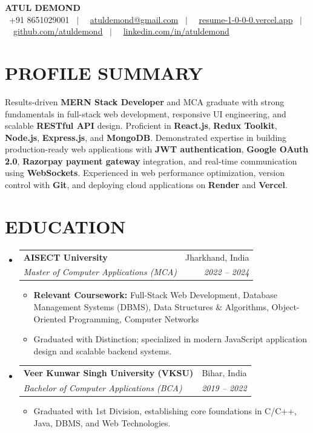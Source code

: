 \documentclass[letterpaper,10pt]{article}
\makeatletter
\newcommand{\resumeItem}[1]{
  \item\small{
    {#1 \vspace{-1.5pt}}
  }
}
\newcommand{\resumeSubheading}[4]{
  \vspace{-1.5pt}\item
    \begin{tabular*}{0.97\textwidth}[t]{l@{\extracolsep{\fill}}r}
      \textbf{#1} & #2 \\
      \textit{\small#3} & \textit{\small #4} \\
    \end{tabular*}\vspace{-6pt}
}
\newcommand{\resumeSubHeadingListStart}{\begin{itemize}[leftmargin=0.15in, label={}]}
\newcommand{\resumeSubHeadingListEnd}{\end{itemize}}
\newcommand{\resumeItemListStart}{\begin{itemize}[leftmargin=0.15in]}
\newcommand{\resumeItemListEnd}{\end{itemize}\vspace{-4pt}}
\makeatother
\begin{document}
\begin{center}
    {\Huge \textbf{ATUL DEMOND}} \\ \vspace{4pt}
    \small
    \faPhone* \ +91 8651029001 \ $|$ \
    \faEnvelope \ \href{mailto:atuldemond@gmail.com}{atuldemond@gmail.com} \ $|$ \
    \faGlobe \ \href{https://resume-1-0-0-0.vercel.app}{resume-1-0-0-0.vercel.app} \ $|$ \
    \faGithub \ \href{https://github.com/atuldemond}{github.com/atuldemond} \ $|$ \
    \faLinkedin \ \href{https://linkedin.com/in/atuldemond}{linkedin.com/in/atuldemond}
\end{center}
\vspace{-6pt}

\section{PROFILE SUMMARY}
\small{Results-driven \textbf{MERN Stack Developer} and MCA graduate with strong fundamentals in full-stack web development, responsive UI engineering, and scalable \textbf{RESTful API} design. Proficient in \textbf{React.js}, \textbf{Redux Toolkit}, \textbf{Node.js}, \textbf{Express.js}, and \textbf{MongoDB}. Demonstrated expertise in building production-ready web applications with \textbf{JWT authentication}, \textbf{Google OAuth 2.0}, \textbf{Razorpay payment gateway} integration, and real-time communication using \textbf{WebSockets}. Experienced in web performance optimization, version control with \textbf{Git}, and deploying cloud applications on \textbf{Render} and \textbf{Vercel}.}

\section{EDUCATION}
\resumeSubHeadingListStart
  \resumeSubheading
    {AISECT University}{Jharkhand, India}
    {Master of Computer Applications (MCA)}{2022 -- 2024}
    \resumeItemListStart
      \resumeItem{\textbf{Relevant Coursework:} Full-Stack Web Development, Database Management Systems (DBMS), Data Structures \& Algorithms, Object-Oriented Programming, Computer Networks}
      \resumeItem{Graduated with Distinction; specialized in modern JavaScript application design and scalable backend systems.}
    \resumeItemListEnd
  \resumeSubheading
    {Veer Kunwar Singh University (VKSU)}{Bihar, India}
    {Bachelor of Computer Applications (BCA)}{2019 -- 2022}
    \resumeItemListStart
      \resumeItem{Graduated with 1st Division, establishing core foundations in C/C++, Java, DBMS, and Web Technologies.}
    \resumeItemListEnd
\resumeSubHeadingListEnd
\end{document}
